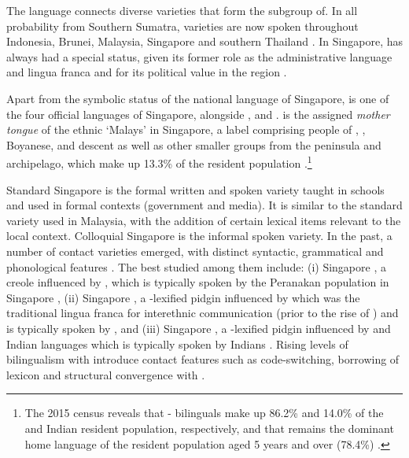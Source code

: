 \documentclass[output=paper
,modfonts
,nonflat]{langsci/langscibook}
\begin{document}
The  language connects diverse varieties that form the  subgroup of\linebreak {}. In all probability from Southern Sumatra,  varieties are now spoken throughout Indonesia, Brunei, Malaysia, Singapore and southern Thailand \citep{Adelaar2004}. In Singapore,  has always had a special status, given its former role as the administrative language and lingua franca and for its political value in the region \citep{Alsagoff2008}. 

Apart from the symbolic status of the national language of Singapore,  is one of the four official languages of Singapore, alongside ,   and .  is the assigned \emph{mother tongue} of the ethnic `Malays' in Singapore, a label comprising people of , , Boyanese, and  descent as well as other smaller groups from the peninsula and archipelago, which make up 13.3\% of the resident population \citep{KuoJernudd1993, GenHouseholdSurv2015}.\footnote{The 2015 census reveals that - bilinguals make up 86.2\% and 14.0\% of the  and Indian resident population, respectively, and that  remains the dominant home language of the  resident population aged 5 years and over (78.4\%) \citep{GenHouseholdSurv2015}.} 

Standard Singapore  is the formal written and spoken variety taught in schools and used in formal contexts (government and media). It is similar to the standard variety used in Malaysia, with the addition of certain lexical items relevant to the local context. Colloquial Singapore  is the informal spoken variety. In the past, a number of contact varieties emerged, with distinct syntactic, grammatical and phonological features \citep{Rekha2007}. The best studied among them include: (i) Singapore , a  creole influenced by , which is typically spoken by the Peranakan population in Singapore \citep{Lee2014}, (ii) Singapore , a -lexified pidgin influenced by  which was the traditional lingua franca for interethnic communication (prior to the rise of ) and is typically spoken by  , and (iii) Singapore , a -lexified pidgin influenced by  and Indian languages which is typically spoken by  Indians \citep{Prentice1996, Daw2005, Rekha2007}. Rising levels of bilingualism with  introduce contact features such as code-switching, borrowing of lexicon and structural convergence with .
\end{document}

